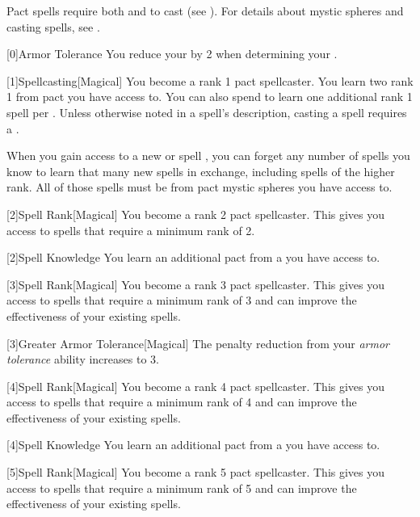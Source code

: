         Pact spells require both  and  to cast (see ).
        For details about mystic spheres and casting spells, see .

        [0]{Armor Tolerance} You reduce your  by 2 when determining your .

        [1]{Spellcasting}[Magical]
        You become a rank 1 pact spellcaster.
        You learn two rank 1  from pact  you have access to.
        You can also spend  to learn one additional rank 1 spell per .
        Unless otherwise noted in a spell's description, casting a spell requires a .

        When you gain access to a new  or spell ,
            you can forget any number of spells you know to learn that many new spells in exchange,
            including spells of the higher rank.
        All of those spells must be from pact mystic spheres you have access to.

        [2]{Spell Rank}[Magical] You become a rank 2 pact spellcaster.
        This gives you access to spells that require a minimum rank of 2.

        [2]{Spell Knowledge} You learn an additional pact  from a  you have access to.

        [3]{Spell Rank}[Magical] You become a rank 3 pact spellcaster.
        This gives you access to spells that require a minimum rank of 3 and can improve the effectiveness of your existing spells.

        [3]{Greater Armor Tolerance}[Magical] The penalty reduction from your \textit{armor tolerance} ability increases to 3.

        [4]{Spell Rank}[Magical] You become a rank 4 pact spellcaster.
        This gives you access to spells that require a minimum rank of 4 and can improve the effectiveness of your existing spells.

        [4]{Spell Knowledge} You learn an additional pact  from a  you have access to.

        [5]{Spell Rank}[Magical] You become a rank 5 pact spellcaster.
        This gives you access to spells that require a minimum rank of 5 and can improve the effectiveness of your existing spells.

